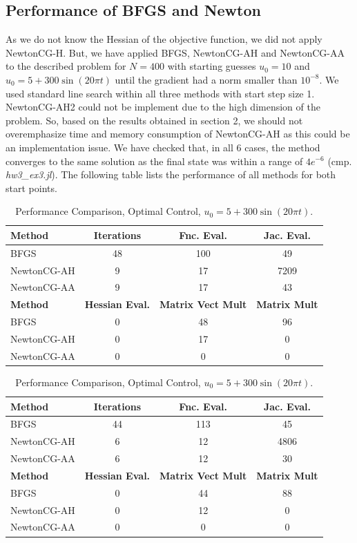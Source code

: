 \documentclass{article}
\begin{document}
\subsection{Performance of BFGS and Newton}
As we do not know the Hessian of the objective function, we did not apply NewtonCG-H.
But, we  have applied BFGS, NewtonCG-AH and NewtonCG-AA to the described problem for $N=400$ with starting guesses
$u_{0}=10$ and $u_{0}=5+300 \sin(20\pi t)$ until the gradient had a norm smaller than $10^{-8}$. We used standard line search within all three methods with start step size 1. NewtonCG-AH2 could not be implement due to the high dimension of the problem. So, based on the results obtained in section 2,
we should not overemphasize time and memory consumption of NewtonCG-AH as this could be an implementation issue. We have checked that, in  all 6 cases, the method converges to the same solution
as the final state was within a range of $4e^{-6}$ (cmp. \textit{hw3\_ex3.jl}). The following table lists the performance of all methods for both start points.
\begin{table}[H]
  \centering
  \begin{tabular}{|l|c|c|c|}
    \hline
   \textbf{Method} & \textbf{Iterations} & \textbf{Fnc. Eval.} &\textbf{Jac. Eval.} \\ \hline
  BFGS &48 &100 &49 \\ \hline
  NewtonCG-AH&9 &17 &7209 \\ \hline
  NewtonCG-AA&9 &17 &43 \\ \hline
 \textbf{Method} & \textbf{Hessian Eval.} & \textbf{Matrix Vect Mult} & \textbf{Matrix Mult} \\ \hline
    BFGS &0 & 48 & 96 \\ \hline
   NewtonCG-AH &0 &17 &0 \\ \hline
   NewtonCG-AA &0 &0 &0 \\ \hline
  \end{tabular}
  \caption{Performance Comparison, Optimal Control, $u_{0}=10$}
  \label{tab:perform2}
  \begin{tabular}{|l|c|c|c|}
    \hline
   \textbf{Method} & \textbf{Iterations} & \textbf{Fnc. Eval.} &\textbf{Jac. Eval.} \\ \hline
  BFGS &44 &113 &45 \\ \hline
  NewtonCG-AH&6 &12 &4806 \\ \hline
  NewtonCG-AA&6 &12 &30 \\ \hline
 \textbf{Method} & \textbf{Hessian Eval.} & \textbf{Matrix Vect Mult} & \textbf{Matrix Mult} \\ \hline
    BFGS &0 & 44 & 88 \\ \hline
   NewtonCG-AH &0 &12 &0 \\ \hline
   NewtonCG-AA &0 &0 &0 \\ \hline
  \end{tabular}
  \caption{Performance Comparison, Optimal Control, $u_{0}=5 + 300 \sin(20\pi t).$}
  \label{tab:perform3}
\end{table}
\end{document}
